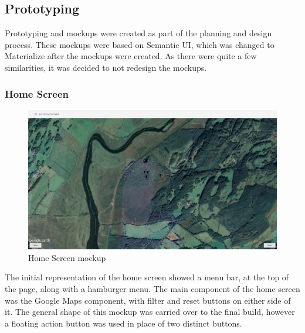 \subsection{Prototyping}

Prototyping and mockups were created as part of the planning and design process. These mockups were based on Semantic UI, which was changed to Materialize after the mockups were created. As there were quite a few similarities, it was decided to not redesign the mockups.

\subsubsection{Home Screen}
\begin{figure}[H]
\includegraphics[scale=0.2]{mockups/Home Screen}
\caption{Home Screen mockup}
\end{figure}

The initial representation of the home screen showed a menu bar, at the top of the page, along with a hamburger menu. The main component of the home screen was the Google Maps component, with filter and reset buttons on either side of it. The general shape of this mockup was carried over to the final build, however a floating action button was used in place of two distinct buttons.
\newpage

